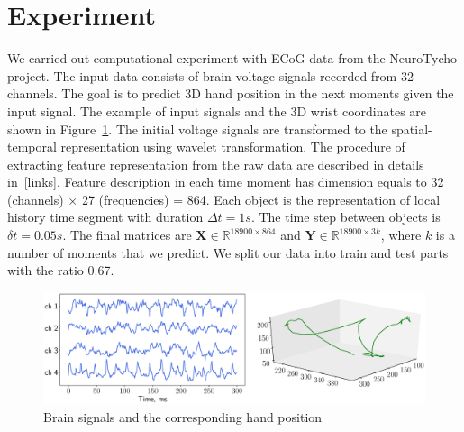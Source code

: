\documentclass[12pt,twoside]{article}
\theoremstyle{definition}
\newcommand{\bY}{\mathbf{Y}}
\newcommand{\bX}{\mathbf{X}}
\newcommand{\bbR}{\mathbb{R}}
\begin{document}
\section{Experiment}
We carried out computational experiment with ECoG data from the NeuroTycho project. The input data consists of brain voltage signals recorded from 32 channels.
The goal is to predict 3D hand position in the next moments given the input signal.
The example of input signals and the 3D wrist coordinates are shown in Figure~\ref{fig:ecog_data}.
The initial voltage signals are transformed to the spatial-temporal representation using wavelet transformation.
The procedure of extracting feature representation from the raw data are described in details in~[links].
Feature description in each time moment has dimension equals to 32 (channels) $\times$ 27 (frequencies) = 864.
Each object is the representation of local history time segment with duration $\Delta t = 1s$. The time step between objects is $\delta t =  0.05s$.
The final matrices are $\bX \in \bbR^{18900 \times 864}$ and $\bY \in \bbR^{18900 \times 3k}$, where $k$ is a number of moments that we predict.
We split our data into train and test parts with the ratio 0.67.

\begin{figure}
	\centering
	\includegraphics[width=\linewidth]{figs/ecog_data}
	\caption{Brain signals and the corresponding hand position}
	\label{fig:ecog_data}
\end{figure}
\end{document}
